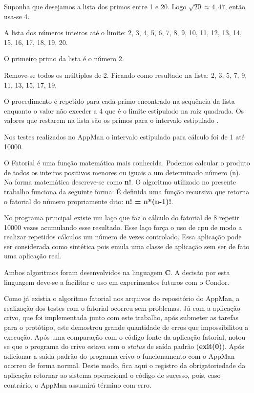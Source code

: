Suponha que desejamos a lista dos primos entre 1 e 20. Logo $\sqrt{20} \approx 4,47$, então usa-se 4. 

A lista dos números inteiros até o limite: 2, 3, 4, 5, 6, 7, 8, 9, 10, 11, 12, 13, 14, 15, 16, 17, 18, 19, 20. 

O primeiro primo da lista é o número 2. 

Remove-se todos os múltiplos de 2. Ficando como resultado na lista: 2, 3, 5, 7, 9, 11, 13, 15, 17, 19.

O procedimento é repetido para cada primo encontrado na sequência da lista enquanto o valor não exceder a 4 que é o limite estipulado na raiz quadrada. Os valores que restarem na lista são os primos para o intervalo estipulado \cite{Ewerton2008}.

Nos testes realizados no AppMan o intervalo estipulado para cálculo foi de 1 até 10000.

O Fatorial é uma função matemática mais conhecida. Podemos calcular o produto de todos os inteiros positivos menores ou iguais a um determinado número (n). Na forma matemática descreve-se como \textbf{n!}. O algoritmo utilizado no presente trabalho funciona da seguinte forma: É definida uma função recursiva que retorna o fatorial do número propriamente dito: {\bf n! = n*(n-1)!}.

No programa principal existe um laço que faz o cálculo do fatorial de 8 repetir 10000 vezes acumulando esse resultado. Esse laço força o uso de cpu de modo a realizar repetidos cálculos um número de vezes controlado. Essa aplicação pode ser considerada como sintética pois emula uma classe de aplicação sem ser de fato uma aplicação real.

Ambos algoritmos foram desenvolvidos na linguagem \textbf{C}. A decisão por esta linguagem deve-se a facilitar o uso em experimentos futuros com o Condor.

Como já existia o algoritmo fatorial nos arquivos do repositório do AppMan, a realização dos testes com o fatorial ocorreu sem problemas. Já com a aplicação crivo, que foi implementada junto com este trabalho, após submeter as tarefas para o protótipo, este demostrou grande quantidade de erros que impossibilitou a execução. Após uma comparação com o código fonte da aplicação fatorial, notou-se que o programa do crivo estava sem o \emph{status} de saída padrão (\textbf{exit(0)}). Após adicionar a saída padrão do programa crivo o funcionamento com o AppMan ocorreu de forma normal. Deste modo, fica aqui o registro da obrigatoriedade da aplicação retornar ao sistema operacional o código de sucesso, pois, caso contrário, o AppMan assumirá término com erro.

